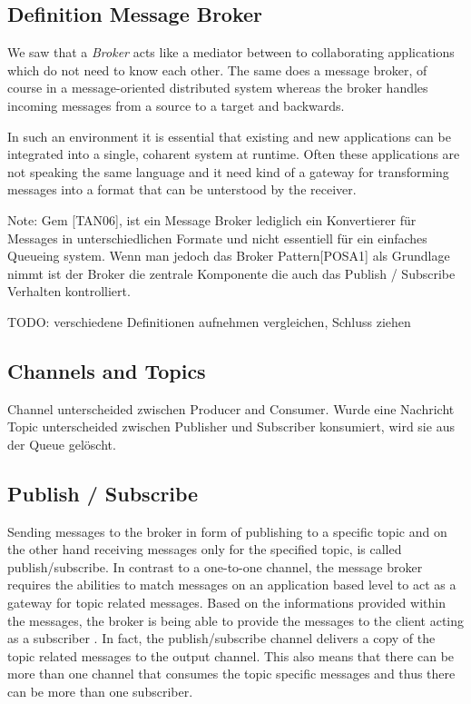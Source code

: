 \subsection{Definition Message Broker}
We saw that a \textit{Broker} acts like a mediator between to collaborating
applications which do not need to know each other. The same does a message
broker, of course in a message-oriented distributed system whereas the broker
handles incoming messages from a source to a target and backwards. 

In such an environment it is essential that existing and new applications can be
integrated into a single, coharent system at runtime. Often these applications
are not speaking the same language and it need kind of a gateway for
transforming messages into a format that can be unterstood by the receiver.
\cite{TAN06}

Note: Gem [TAN06], ist ein Message Broker lediglich ein Konvertierer für
Messages in unterschiedlichen Formate und nicht essentiell für ein einfaches
Queueing system. Wenn man jedoch das Broker Pattern[POSA1] als Grundlage nimmt
ist der Broker die zentrale Komponente die auch das Publish / Subscribe
Verhalten kontrolliert. 

TODO: verschiedene Definitionen aufnehmen vergleichen, Schluss ziehen \\

\subsection{Channels and Topics} %
Channel unterscheided zwischen Producer and Consumer. Wurde eine Nachricht
Topic unterscheided zwischen Publisher und Subscriber
konsumiert, wird sie aus der Queue gelöscht. 

\subsection{Publish / Subscribe}
Sending messages to the broker in form of publishing to a specific topic and
on the other hand receiving messages only for the specified topic, is called
publish/subscribe.
In contrast to a one-to-one channel, the message broker requires the abilities 
to match messages on an application based level to act as a gateway for topic
related messages. Based on the informations provided within the messages, 
the broker is being able to provide the messages to the client acting as a 
subscriber \cite{TAN06}. In fact, the publish/subscribe channel delivers a copy of the 
topic related messages to the output channel. This also means that there can 
be more than one channel that consumes the topic specific messages and thus there
can be more than one subscriber. \cite{EIP03}



